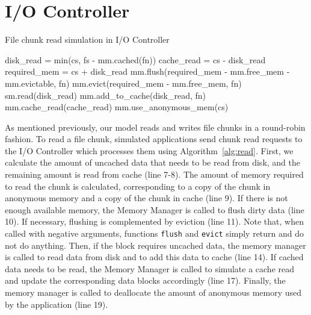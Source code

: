 \section{I/O Controller}

\begin{algorithm}\caption{File chunk read simulation in I/O Controller}
\label{alg:read}
    \small
    \begin{algorithmic}[1]
        \Input
           \EndInput
           \State disk\_read = min(cs, fs - mm.cached(fn)) 
           \State cache\_read = cs - disk\_read 
           \State required\_mem = cs + disk\_read
           \State mm.flush(required\_mem - mm.free\_mem - mm.evictable, fn)
           \State mm.evict(required\_mem - mm.free\_mem, fn)
             
           \State sm.read(disk\_read)
           \State mm.add\_to\_cache(disk\_read, fn)
           \EndIf
            
           \State mm.cache\_read(cache\_read)
        \EndIf
        \State mm.use\_anonymous\_mem(cs)
    \end{algorithmic}
\end{algorithm}
As mentioned previously, our model reads and writes file chunks in a
round-robin fashion. To read a file chunk, simulated applications send
chunk read requests to the I/O Controller which processes them using
Algorithm~\ref{alg:read}. First, we calculate the amount of uncached
data that needs to be read from disk, and the remaining amount is read
from cache (line 7-8). The amount of memory required to read the chunk
is calculated, corresponding to a copy of the chunk in anonymous memory
and a copy of the chunk in cache (line 9).
If there is not enough available memory, the Memory Manager is called
to flush dirty data (line 10). If necessary, flushing is complemented by
eviction (line 11). Note that, when called with negative arguments, functions
\texttt{flush} and \texttt{evict} simply return and do not do anything. Then,
if the block requires
uncached data, the memory manager is called to read data from disk and to add this
data to cache (line 14).
If cached data needs to be read, the Memory Manager is called to simulate
a cache read  and update the corresponding data blocks accordingly (line 17).
Finally, the memory manager is called to deallocate the amount of anonymous memory used by the application (line 19).

